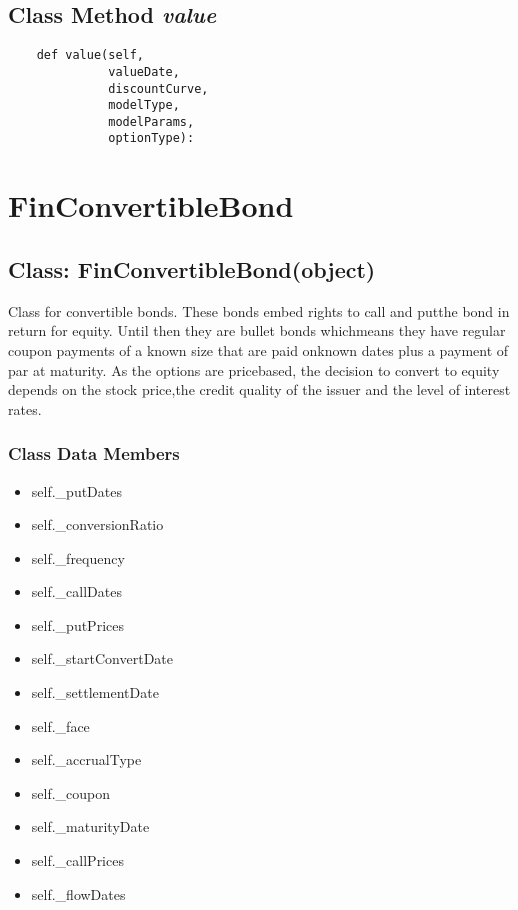 \documentclass[twoside,11pt]{book}
\begin{document}
\subsection{Class Method {\it value}}


\begin{lstlisting}
    def value(self,
              valueDate,
              discountCurve,
              modelType,
              modelParams,
              optionType):
\end{lstlisting}

\newpage
\section{FinConvertibleBond}

\subsection{Class: FinConvertibleBond(object)}
Class for convertible bonds. These bonds embed rights to call and putthe bond in return for equity. Until then they are bullet bonds whichmeans they have regular coupon payments of a known size that are paid onknown dates plus a payment of par at maturity. As the options are pricebased, the decision to convert to equity depends on the stock price,the credit quality of the issuer and the level of interest rates.

\subsubsection{Class Data Members}
\begin{itemize}
\item{self.\_putDates}
\item{self.\_conversionRatio}
\item{self.\_frequency}
\item{self.\_callDates}
\item{self.\_putPrices}
\item{self.\_startConvertDate}
\item{self.\_settlementDate}
\item{self.\_face}
\item{self.\_accrualType}
\item{self.\_coupon}
\item{self.\_maturityDate}
\item{self.\_callPrices}
\item{self.\_flowDates}
\end{itemize}
\end{document}
